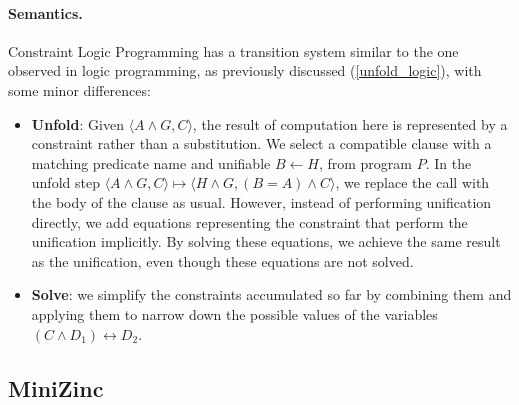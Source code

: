 \documentclass{article}
\begin{document}
\paragraph{Semantics.} Constraint Logic Programming has a transition system
similar to the one observed in logic programming, as previously discussed
(\ref{unfold_logic}), with some minor differences:
\begin{itemize}
    \item \textbf{Unfold}: Given $\langle A\land G, C\rangle$, the result of
        computation here is represented by a constraint rather than a
        substitution. We select a compatible clause with a matching predicate
        name and unifiable $B\leftarrow H$, from program $P$. In the unfold
        step $\langle A\land G, C\rangle \mapsto\langle H\land G,(B=A)\land
        C\rangle$, we replace the call with the body of the clause as usual.
        However, instead of performing unification directly, we add equations
        representing the constraint that perform the unification implicitly.
        By solving these equations, we achieve the same result as the
        unification, even though these equations are not solved.
    \item \textbf{Solve}: we simplify the constraints accumulated so far by
        combining them and applying them to narrow down the possible values of
        the variables $(C\land D_1)\leftrightarrow D_2$.
\end{itemize}
\subsection{MiniZinc}
\end{document}
